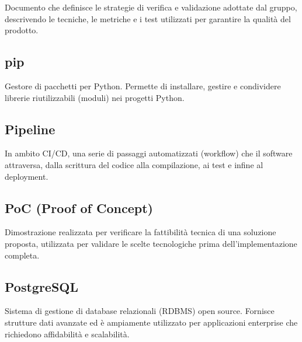 \documentclass[a4paper, 11pt, oneside]{scrartcl} %
\begin{document}
Documento che definisce le strategie di verifica e validazione adottate dal gruppo, descrivendo le tecniche, le metriche e i test utilizzati per garantire la qualità del prodotto.

\vspace{0.5cm}

\subsection*{pip}


Gestore di pacchetti per Python. Permette di installare, gestire e condividere librerie riutilizzabili (moduli) nei progetti Python.

\vspace{0.5cm}

\subsection*{Pipeline}
In ambito CI/CD, una serie di passaggi automatizzati (workflow) che il software attraversa, dalla scrittura del codice alla compilazione, ai test e infine al deployment.
\vspace{0.5cm}

\subsection*{PoC (Proof of Concept)}


Dimostrazione realizzata per verificare la fattibilità tecnica di una soluzione proposta, utilizzata per validare le scelte tecnologiche prima dell'implementazione completa.

\vspace{0.5cm}

\subsection*{PostgreSQL}


Sistema di gestione di database relazionali (RDBMS) open source. Fornisce strutture dati avanzate ed è ampiamente utilizzato per applicazioni enterprise che richiedono affidabilità e scalabilità.

\vspace{0.5cm}
\end{document}
